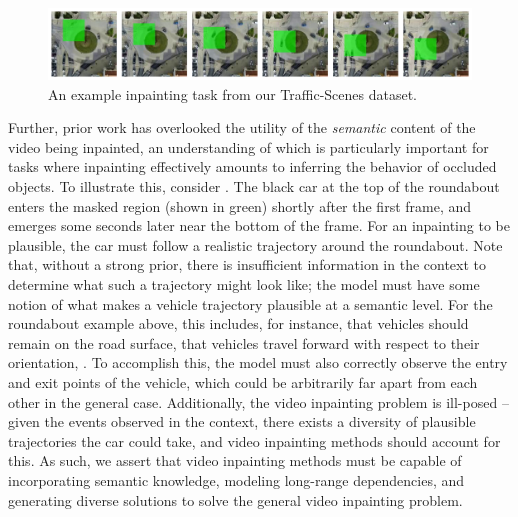 \begin{figure}
\centering
\includegraphics[width=\textwidth]{figures/13269_task_only.pdf}
\caption[An example inpainting task from our Traffic-Scenes dataset.]{An example inpainting task from our Traffic-Scenes dataset. }
\label{fig:semantics}
\end{figure}
Further, prior work has overlooked the utility of the \emph{semantic} content of the video being inpainted, an understanding of which is particularly important for tasks where inpainting effectively amounts to inferring the behavior of occluded objects. To illustrate this, consider . The black car at the top of the roundabout enters the masked region (shown in green) shortly after the first frame, and emerges some seconds later near the bottom of the frame. For an inpainting to be plausible, the car must follow a realistic trajectory around the roundabout. Note that, without a strong prior, there is insufficient information in the context to determine what such a trajectory might look like; the model must have some notion of what makes a vehicle trajectory plausible at a semantic level. For the roundabout example above, this includes, for instance, that vehicles should remain on the road surface, that vehicles travel forward with respect to their orientation, \etc. To accomplish this, the model must also correctly observe the entry and exit points of the vehicle, which could be arbitrarily far apart from each other in the general case. Additionally, the video inpainting problem is ill-posed -- given the events observed in the context, there exists a diversity of plausible trajectories the car could take, and video inpainting methods should account for this. As such, we assert that video inpainting methods must be capable of incorporating semantic knowledge, modeling long-range dependencies, and generating diverse solutions to solve the general video inpainting problem.

